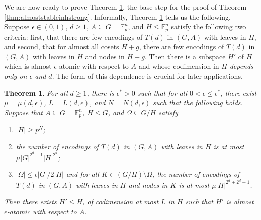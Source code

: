 \documentclass[12pt,oneside,british,a4wide]{amsart}
\newtheorem{theorem}{Theorem}[section]
\numberwithin{equation}{section}
\theoremstyle{definition}
\def\F{\mathbb{F}}
\def\e{\epsilon}
\begin{document}
We are now ready to prove Theorem \ref{thm:stableinh},  the base step for the proof of Theorem \ref{thm:almoststableinhstrong}.  Informally, Theorem \ref{thm:stableinh} tells us the following. Suppose $\e\in (0,1)$, $d\geq 1$, $A\subseteq G=\F_p^n$, and $H\leqslant \F_p^n$ satisfy the following two criteria: first, that there are few encodings of $T(d)$ in $(G,A)$ with leaves in $H$, and second, that for almost all cosets $H+g$,  there are few encodings of $T(d)$ in $(G,A)$ with leaves in $H$ and nodes in $H+g$.  Then there is a subspace $H'$ of $H$ which is almost $\e$-atomic with respect to $A$ and whose codimension in $H$ \emph{depends only on $\e$ and $d$}.  The form of this dependence is crucial for later applications.

\begin{theorem}\label{thm:stableinh}
For all $d\geq 1$, there is $\e^*>0$ such that for all $0<\e\leq \e^*$, there exist $\mu=\mu(d,\e)$, $L=L(d,\e)$, and $N=N(d,\e)$ such that the following holds.  Suppose that $A\subseteq G=\F_p^n$, $H\leqslant G$, and $\Omega\subseteq G/H$ satisfy
\begin{enumerate}[label=\normalfont(\roman*)]
\item $|H|\geq p^N$;
\item the number of encodings of $T(d)$ in $(G,A)$ with leaves in $H$ is at most $\mu  |G|^{2^{d}-1}|H|^{2^d}$;
\item $|\Omega|\leq \e |G|/2|H|$ and for all $K\in (G/H)\setminus \Omega$, the number of encodings of $T(d)$ in $(G,A)$ with leaves in $H$ and nodes in $K$ is at most $\mu |H|^{2^d+2^d-1}$.
\end{enumerate}
Then there exists $H'\leqslant H$, of codimension at most $L$ in $H$ such that $H'$ is almost $\e$-atomic with respect to $A$. 
\end{theorem}
\end{document}
